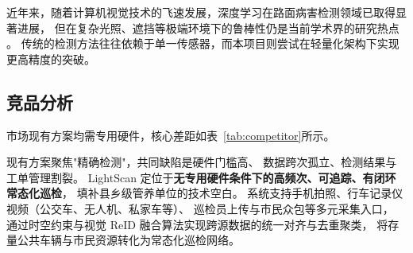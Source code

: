 \documentclass[UTF8, a4paper, fontset=ubuntu]{ctexart}
\begin{document}
近年来，随着计算机视觉技术的飞速发展，深度学习在路面病害检测领域已取得显著进展，
但在复杂光照、遮挡等极端环境下的鲁棒性仍是当前学术界的研究热点 \cite{fan2024survey}\cite{lin2026yolo11wlbs}\cite{aqeel2025roadfusion}\cite{cheng2025survey}。
传统的检测方法往往依赖于单一传感器，而本项目则尝试在轻量化架构下实现更高精度的突破。

  \subsection{竞品分析}

  市场现有方案均需专用硬件，核心差距如表~\ref{tab:competitor}所示。

  \begin{table}[H]
  \centering
  \caption{主要竞品对比}
  \label{tab:competitor}
  \end{table}

  现有方案聚焦"精确检测"，共同缺陷是硬件门槛高、
  数据跨次孤立、检测结果与工单管理割裂。
  LightScan 定位于\textbf{无专用硬件条件下的高频次、可追踪、有闭环常态化巡检}，
  填补县乡级管养单位的技术空白。
  系统支持手机拍照、行车记录仪视频（公交车、无人机、私家车等）、
  巡检员上传与市民众包等多元采集入口，
  通过时空约束与视觉 ReID 融合算法实现跨源数据的统一对齐与去重聚类，
  将存量公共车辆与市民资源转化为常态化巡检网络。
\end{document}
